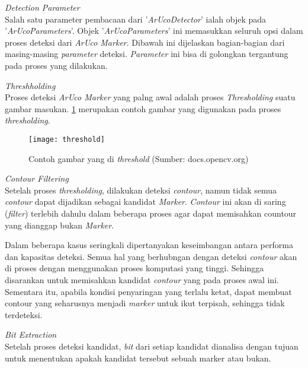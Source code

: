 \begin{packed_item}
	\item \textit{Detection Parameter}
	\\ Salah satu parameter pembacaan dari '\textit{ArUcoDetector}' ialah objek pada '\textit{ArUcoParameters}'. Objek '\textit{ArUcoParameters}' ini memasukkan seluruh opsi dalam proses deteksi dari \textit{ArUco Marker}. Dibawah ini dijelaskan bagian-bagian dari masing-masing \textit{parameter} deteksi. \textit{Parameter} ini bisa di golongkan tergantung pada proses yang dilakukan.
		\begin{packed_enum}
			\item \textit{Threshholding}
			\\ Proses deteksi \textit{ArUco Marker} yang palng awal adalah proses \textit{Thresholding} suatu gambar masukan. \cref{fig:threshold} merupakan contoh gambar yang digunakan pada proses \textit{thresholding}.
			
			\begin{figure}[H]
				\centering
				\texttt{[image: threshold]}
				\caption{Contoh gambar yang di \textit{threshold} (Sumber: docs.opencv.org)}
				\label{fig:threshold}
			\end{figure}
			
			\item \textit{Contour Filtering}
			\\	Setelah proses \textit{thresholding}, dilakukan deteksi \textit{contour}, namun tidak semua \textit{contour} dapat dijadikan sebagai kandidat \textit{Marker}. \textit{Contour} ini akan di saring (\textit{filter}) terlebih dahulu dalam beberapa proses agar dapat memisahkan countour yang dianggap bukan \textit{Marker}. 
			
			Dalam beberapa kasus seringkali dipertanyakan keseimbangan antara performa dan kapasitas deteksi. Semua hal yang berhubngan dengan deteksi \textit{contour} akan di proses dengan menggunakan proses komputasi yang tinggi. Sehingga disarankan untuk memisahkan kandidat \textit{contour} yang pada proses awal ini. Sementara itu, apabila kondisi penyaringan yang terlalu ketat, dapat membuat contour yang seharusnya menjadi \textit{marker} untuk ikut terpisah, sehingga tidak terdeteksi. 		
			
			\item \textit{Bit Extraction}
			\\ Setelah proses deteksi kandidat, \textit{bit} dari setiap kandidat dianalisa dengan tujuan untuk menentukan apakah kandidat tersebut sebuah marker atau bukan.
			

\end{packed_enum}
\end{packed_item}
